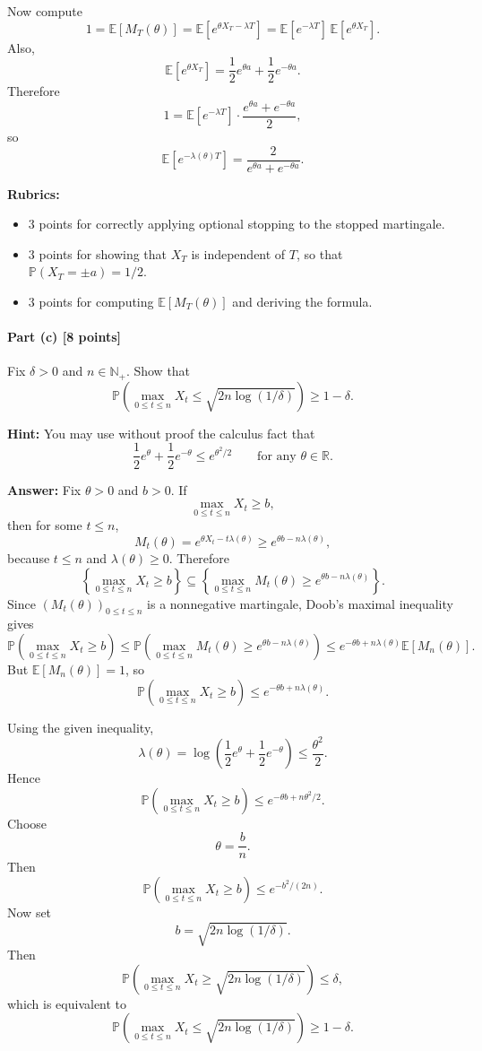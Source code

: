 \documentclass[11pt]{article}
\theoremstyle{definition}
\begin{document}
Now compute
\[
1=\mathbb E[M_T(\theta)]
=
\mathbb E[e^{\theta X_T-\lambda T}]
=
\mathbb E[e^{-\lambda T}]\,\mathbb E[e^{\theta X_T}].
\]
Also,
\[
\mathbb E[e^{\theta X_T}]
=
\frac12 e^{\theta a}+\frac12 e^{-\theta a}.
\]
Therefore
\[
1
=
\mathbb E[e^{-\lambda T}]
\cdot
\frac{e^{\theta a}+e^{-\theta a}}{2},
\]
so
\[
\mathbb E[e^{-\lambda(\theta)T}]
=
\frac{2}{e^{\theta a}+e^{-\theta a}}.
\]

\textbf{Rubrics:}
\begin{itemize}[leftmargin=2em]
    \item \(3\) points for correctly applying optional stopping to the stopped martingale.
    \item \(3\) points for showing that \(X_T\) is independent of \(T\), so that \(\mathbb P(X_T=\pm a)=1/2\).
    \item \(3\) points for computing \(\mathbb E[M_T(\theta)]\) and deriving the formula.
\end{itemize}

\paragraph{Part (c) \hfill [8 points]}
Fix \(\delta>0\) and \(n\in \mathbb N_+\). Show that
\[
\mathbb P\left(\max_{0\le t\le n} X_t \le \sqrt{2n\log(1/\delta)}\right)\ge 1-\delta.
\]

\textbf{Hint:} You may use without proof the calculus fact that
\[
\frac12 e^\theta+\frac12 e^{-\theta}\le e^{\theta^2/2}
\qquad \text{for any } \theta\in\mathbb R.
\]

\textbf{Answer:}
Fix \(\theta>0\) and \(b>0\). If
\[
\max_{0\le t\le n} X_t\ge b,
\]
then for some \(t\le n\),
\[
M_t(\theta)=e^{\theta X_t-t\lambda(\theta)}\ge e^{\theta b-n\lambda(\theta)},
\]
because \(t\le n\) and \(\lambda(\theta)\ge 0\). Therefore
\[
\left\{\max_{0\le t\le n} X_t\ge b\right\}
\subseteq
\left\{\max_{0\le t\le n} M_t(\theta)\ge e^{\theta b-n\lambda(\theta)}\right\}.
\]
Since \((M_t(\theta))_{0\le t\le n}\) is a nonnegative martingale, Doob's maximal inequality gives
\[
\mathbb P\left(\max_{0\le t\le n} X_t\ge b\right)
\le
\mathbb P\left(\max_{0\le t\le n} M_t(\theta)\ge e^{\theta b-n\lambda(\theta)}\right)
\le
e^{-\theta b+n\lambda(\theta)}\mathbb E[M_n(\theta)].
\]
But \(\mathbb E[M_n(\theta)]=1\), so
\[
\mathbb P\left(\max_{0\le t\le n} X_t\ge b\right)
\le
e^{-\theta b+n\lambda(\theta)}.
\]

Using the given inequality,
\[
\lambda(\theta)
=
\log\left(\frac12 e^\theta+\frac12 e^{-\theta}\right)
\le
\frac{\theta^2}{2}.
\]
Hence
\[
\mathbb P\left(\max_{0\le t\le n} X_t\ge b\right)
\le
e^{-\theta b+n\theta^2/2}.
\]
Choose
\[
\theta=\frac{b}{n}.
\]
Then
\[
\mathbb P\left(\max_{0\le t\le n} X_t\ge b\right)
\le
e^{-b^2/(2n)}.
\]
Now set
\[
b=\sqrt{2n\log(1/\delta)}.
\]
Then
\[
\mathbb P\left(\max_{0\le t\le n} X_t\ge \sqrt{2n\log(1/\delta)}\right)\le \delta,
\]
which is equivalent to
\[
\mathbb P\left(\max_{0\le t\le n} X_t \le \sqrt{2n\log(1/\delta)}\right)\ge 1-\delta.
\]
\end{document}

